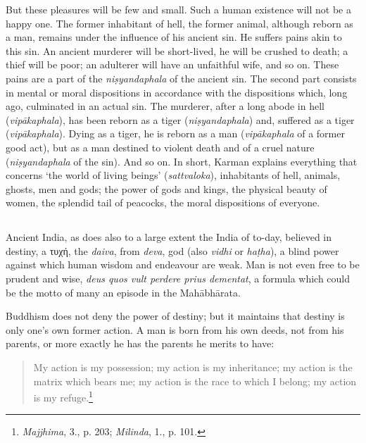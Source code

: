 \documentclass[a4paper, 11pt, oneside, english, landscape]{article}
\begin{document}
But these pleasures will be few and small. Such a human existence will not be a happy one. The former inhabitant of hell, the former animal, although reborn as a man, remains under the influence of his ancient sin. He suffers pains akin to this sin. An ancient murderer will be short-lived, he will be crushed to death; a thief will be poor; an adulterer will have an unfaithful wife, and so on. These pains are a part of the \emph{niṣyandaphala} of the ancient sin. The second part consists in mental or moral dispositions in accordance with the dispositions which, long ago, culminated in an actual sin. The murderer, after a long abode in hell (\emph{vipākaphala}), has been reborn as a tiger (\emph{niṣyandaphala}) and, suffered as a tiger (\emph{vipākaphala}). Dying as a tiger, he is reborn as a man (\emph{vipākaphala} of a former good act), but as a man destined to violent death and of a cruel nature (\emph{niṣyandaphala} of the sin). And so on. In short, Karman explains everything that concerns `the world of living beings' (\emph{sattvaloka}), inhabitants of hell, animals, ghosts, men and gods; the power of gods and kings, the physical beauty of women, the splendid tail of peacocks, the moral dispositions of everyone.

\subsection{}
\paragraph{}
Ancient India, as does also to a large extent the India of to-day, believed in destiny, a τυχή, the \emph{daiva}, from \emph{deva}, god (also \emph{vidhi} or \emph{haṭha}), a blind power against which human wisdom and endeavour are weak. Man is not even free to be prudent and wise, \emph{deus quos vult perdere prius dementat}, a formula which could be the motto of many an episode in the Mahābhārata.

Buddhism does not deny the power of destiny; but it maintains that destiny is only one's own former action. A man is born from his own deeds, not from his parents, or more exactly he has the parents he merits to have:
\begin{quotation}
\small
My action is my possession; my action is my inheritance; my action is the matrix which bears me; my action is the race to which I belong; my action is my refuge.\footnote{\emph{Majjhima}, 3., p. 203; \emph{Milinda}, 1., p. 101.}
\end{quotation}
\end{document}
